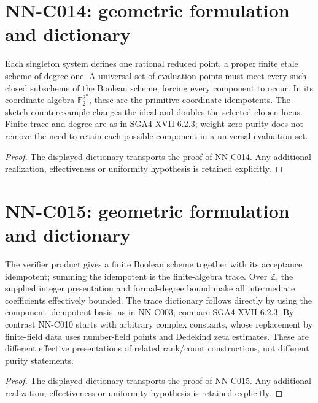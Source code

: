 \section{NN-C014: geometric formulation and dictionary}
\begin{geometricstatement}[NN-C014]
Each singleton system defines one rational reduced point, a proper finite etale scheme of degree one. A universal set of evaluation points must meet every such closed subscheme of the Boolean scheme, forcing every component to occur. In its coordinate algebra $\mathbb F_2^{2^n}$, these are the primitive coordinate idempotents. The sketch counterexample changes the ideal and doubles the selected clopen locus. Finite trace and degree are as in SGA4 XVII 6.2.3; weight-zero purity does not remove the need to retain each possible component in a universal evaluation set.
\end{geometricstatement}
\begin{proof} The displayed dictionary transports the proof of NN-C014. Any additional realization, effectiveness or uniformity hypothesis is retained explicitly.\end{proof}


\section{NN-C015: geometric formulation and dictionary}
\begin{geometricstatement}[NN-C015]
The verifier product gives a finite Boolean scheme together with its acceptance idempotent; summing the idempotent is the finite-algebra trace. Over $\mathbb Z$, the supplied integer presentation and formal-degree bound make all intermediate coefficients effectively bounded. The trace dictionary follows directly by using the component idempotent basis, as in NN-C003; compare SGA4 XVII 6.2.3. By contrast NN-C010 starts with arbitrary complex constants, whose replacement by finite-field data uses number-field points and Dedekind zeta estimates. These are different effective presentations of related rank/count constructions, not different purity statements.
\end{geometricstatement}
\begin{proof} The displayed dictionary transports the proof of NN-C015. Any additional realization, effectiveness or uniformity hypothesis is retained explicitly.\end{proof}


